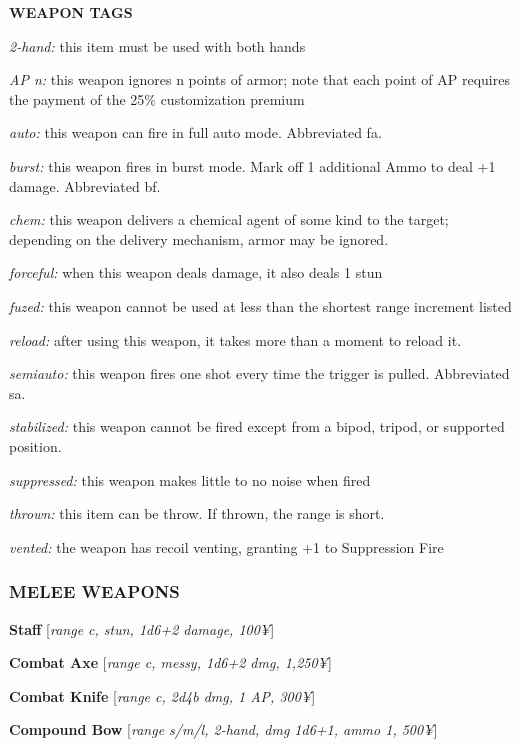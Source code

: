 \documentclass[oneside,10pt]{article}
\begin{document}
\begin{multicols}{2}
  \textbf{WEAPON TAGS}
  \begin{dent}

    \textit{2-hand:} this item must be used with both hands

    \textit{AP n:} this weapon ignores n points of armor; note that
    each point of AP requires the payment of the 25\% customization
    premium

    \textit{auto:} this weapon can fire in full auto mode. Abbreviated
    fa.

    \textit{burst:} this weapon fires in burst mode. Mark off 1
    additional Ammo to deal +1 damage. Abbreviated bf.

    \textit{chem:} this weapon delivers a chemical agent of some kind
    to the target; depending on the delivery mechanism, armor may be
    ignored.

    \textit{forceful:} when this weapon deals damage, it also deals 1
    stun

    \textit{fuzed:} this weapon cannot be used at less than the
    shortest range increment listed

    \textit{reload:} after using this weapon, it takes more than a
    moment to reload it.

    \textit{semiauto:} this weapon fires one shot every time the
    trigger is pulled. Abbreviated sa.

    \textit{stabilized:} this weapon cannot be fired except from a
    bipod, tripod, or supported position.

    \textit{suppressed:} this weapon makes little to no noise when
    fired

    \textit{thrown:} this item can be throw. If thrown, the range is
    short.

    \textit{vented:} the weapon has recoil venting, granting +1 to
    Suppression Fire
  \end{dent}

  \subsubsection{MELEE WEAPONS}
  \textbf{Staff} [\textit{range c, stun, 1d6+2 damage, 100¥}]

  \textbf{Combat Axe} [\textit{range c, messy, 1d6+2 dmg, 1,250¥}]

  \textbf{Combat Knife} [\textit{range c, 2d4b dmg, 1 AP, 300¥}]

  \textbf{Compound Bow} [\textit{range s/m/l, 2-hand, dmg 1d6+1, ammo
    1, 500¥}]


\end{multicols}
\end{document}
